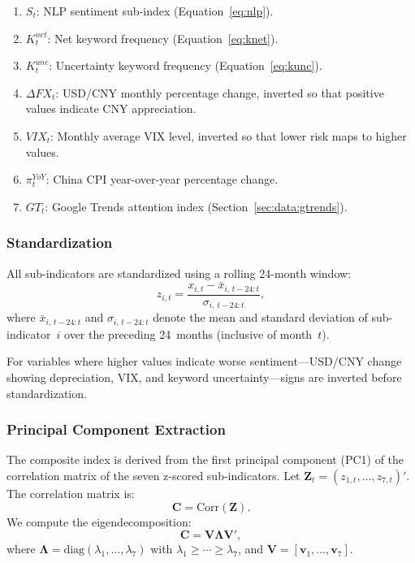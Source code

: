 \documentclass[11pt]{article}
\begin{document}
\begin{enumerate}[nosep]
  \item $S_t$: NLP sentiment sub-index (Equation~\ref{eq:nlp}).
  \item $K_t^{net}$: Net keyword frequency
    (Equation~\ref{eq:knet}).
  \item $K_t^{unc}$: Uncertainty keyword frequency
    (Equation~\ref{eq:kunc}).
  \item $\Delta FX_t$: USD/CNY monthly percentage change, inverted so
    that positive values indicate CNY appreciation.
  \item $VIX_t$: Monthly average VIX level, inverted so that lower
    risk maps to higher values.
  \item $\pi_t^{YoY}$: China CPI year-over-year percentage change.
  \item $GT_t$: Google Trends attention index
    (Section~\ref{sec:data:gtrends}).
\end{enumerate}

\subsubsection{Standardization}

All sub-indicators are standardized using a rolling 24-month window:
\begin{equation}\label{eq:zscore}
  z_{i,t} = \frac{x_{i,t} - \bar{x}_{i,\,t-24:t}}
                  {\sigma_{i,\,t-24:t}},
\end{equation}
where $\bar{x}_{i,\,t-24:t}$ and $\sigma_{i,\,t-24:t}$ denote the
mean and standard deviation of sub-indicator~$i$ over the preceding
24~months (inclusive of month~$t$).

For variables where higher values indicate worse sentiment---USD/CNY
change showing depreciation, VIX, and keyword uncertainty---signs are
inverted before standardization.

\subsubsection{Principal Component Extraction}

The composite index is derived from the first principal component
(PC1) of the correlation matrix of the seven z-scored
sub-indicators.  Let $\mathbf{Z}_t = (z_{1,t}, \ldots, z_{7,t})'$.
The correlation matrix is:
\begin{equation}\label{eq:corr}
  \mathbf{C} = \text{Corr}(\mathbf{Z}).
\end{equation}
We compute the eigendecomposition:
\begin{equation}\label{eq:eigen}
  \mathbf{C} = \mathbf{V} \boldsymbol{\Lambda} \mathbf{V}',
\end{equation}
where $\boldsymbol{\Lambda} = \text{diag}(\lambda_1, \ldots,
\lambda_7)$ with $\lambda_1 \geq \cdots \geq \lambda_7$, and
$\mathbf{V} = [\mathbf{v}_1, \ldots, \mathbf{v}_7]$.
\end{document}
